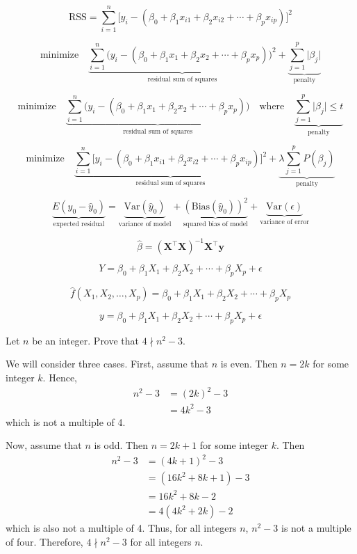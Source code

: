 \documentclass[12pt]{article}
\begin{document}
\[
	\text{RSS} = \sum\limits_{i = 1}^n \Big[ y_i - (\beta_0 + \beta_1 x_{i1} + \beta_2 x_{i2} + \cdots + \beta_p x_{ip})\Big]^2
\]

\[
\text{minimize}\quad \underbrace{\sum\limits_{i = 1}^n \Big( y_i - (\beta_0 + \beta_1 x_1 + \beta_2 x_2 + \cdots + \beta_p x_p)\Big)^2}_{\text{residual sum of squares}} + \underbrace{\sum\limits_{j = 1}^p \vert \beta_j \vert}_{\text{penalty}}
\]

\[
	\text{minimize}\quad \underbrace{\sum\limits_{i = 1}^n \Big( y_i - (\beta_0 + \beta_1 x_1 + \beta_2 x_2 + \cdots + \beta_p x_p)\Big)}_{\text{residual sum of squares}}\quad \text{where}\quad  \underbrace{\sum\limits_{j = 1}^p \vert \beta_j\vert \leq t}_{\text{penalty}}
\]



\[
\text{minimize}\quad \underbrace{\sum\limits_{i = 1}^n \Big[ y_i - (\beta_0 + \beta_1 x_{i1} + \beta_2 x_{i2} + \cdots + \beta_p x_{ip})\Big]^2}_{\text{residual sum of squares}} + \underbrace{\lambda\sum\limits_{j = 1}^p P(\beta_j)}_{\text{penalty}}
\]

\[
	\underbrace{E(y_0 - \hat{y}_0)}_{\text{expected residual}}=\underbrace{\text{Var}(\hat{y}_0)}_{\text{variance of model}} + \underbrace{(\text{Bias}(\hat{y}_0))^2}_{\text{squared bias of model}} + \underbrace{\text{Var}(\epsilon)}_{\text{variance of error}}
\]

\[
	\hat{\beta} = (\mathbf{X}^\top\mathbf{X})^{-1}\mathbf{X}^\top \mathbf{y}
\]

\[
	Y = \beta_0 + \beta_1 X_1 + \beta_2 X_2 + \cdots + \beta_p X_p + \epsilon
\]

\[
	\hat{f}(X_1, X_2, \dotsc, X_p) = \beta_0 + \beta_1 X_1 + \beta_2 X_2 + \cdots + \beta_p X_p
\]

\[
	y = \beta_0 + \beta_1 X_1 + \beta_2 X_2 + \cdots + \beta_p X_p + \epsilon
\]

\newpage

Let $n$ be an integer. Prove that $4\nmid n^2 - 3$.

We will consider three cases. First, assume that $n$ is even. Then $n = 2k$ for some integer $k$. Hence,
\begin{align}
	n^2 - 3 &= (2k)^2 - 3 \\
	&= 4k^2 - 3
\end{align}
which is not a multiple of 4.

Now, assume that $n$ is odd. Then $n = 2k + 1$ for some integer $k$. Then
\begin{align}
	n^2 - 3 &= (4k + 1)^2 - 3 \\
	&= (16k^2 + 8k + 1) - 3\\
	&= 16k^2 + 8k - 2\\
	&= 4(4k^2 + 2k) - 2
\end{align}
which is also not a multiple of 4. Thus, for all integers $n$, $n^2 - 3$ is not a multiple of four. Therefore, $4\nmid n^2 - 3$ for all integers $n$.
\end{document}

